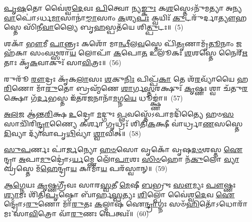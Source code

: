 {\anuvakamend[{}]}

\-\ul{𑌪𑍃}\-\-\ul{𑌷}\-𑌤𑍋 𑌵𑍈॑𑌶𑍍𑌵\-\ul{𑌦𑍇}\-𑌵𑌃 \ul{𑌪𑌿}\-𑌤𑍍𑌵𑍋 𑌨𑍍𑌯\-\ul{𑌙𑍍𑌕𑍁𑌃} 𑌕\-\ul{𑌶}\-𑌸𑍍𑌤𑍇\-𑌽𑌨𑍁᳴𑌮𑌤𑍍𑌯𑌾 𑌅𑌨𑍍𑌯\-\ul{𑌵𑌾}\-𑌪𑍋॑\-𑌽𑌰𑍍𑌧\-\ul{𑌮𑌾}\-𑌸𑌾𑌨𑌾॑\-\ul{𑌮𑍍𑌮𑌾}\-𑌸𑌾𑌂 \ul{𑌕}\-𑌶𑍍𑌯\-\ul{𑌪𑌃} 𑌕𑍍𑌵𑌯𑌿𑌃᳴ \ul{𑌕𑍁}\-𑌟𑌰𑍁᳴𑌰𑍍𑌦𑌾\-\ul{𑌤𑍍𑌯𑍗}\-𑌹𑌸𑍍𑌤𑍇 𑌸𑌿᳴𑌨𑍀\-\ul{𑌵𑌾}\-𑌲𑍍𑌯𑍈 𑌬𑍃\-\ul{𑌹}\-𑌸𑍍𑌪𑌤᳴𑌯𑍇 𑌶𑌿\-\ul{𑌤𑍍𑌪𑍁}\-𑌟𑌃॥~(5)

{\anuvakamend[{}]}

𑌶𑌕𑌾᳴ \ul{𑌭𑍗}\-𑌮𑍀 \ul{𑌪𑌾}\-𑌨𑍍𑌤𑍍𑌰𑌃 𑌕𑌶𑍋᳴ 𑌮𑌾\-\ul{𑌨𑍍𑌥𑍀}\-𑌲\-\ul{𑌵}\-𑌸𑍍𑌤𑍇 𑌪𑌿᳴\-\ul{𑌤𑍃}\-𑌣𑌾𑌮𑍃᳴\-\ul{𑌤𑍂}\-𑌨𑌾𑌂 𑌜𑌹᳴𑌕𑌾 𑌸𑌂𑌵\-\ul{𑌥𑍍𑌸}\-𑌰𑌾\-\ul{𑌯} 𑌲𑍋𑌪𑌾᳴ \ul{𑌕}\-𑌪𑍋\-\ul{𑌤} 𑌉𑌲𑍂᳴𑌕𑌃 \ul{𑌶}\-𑌶𑌸𑍍𑌤𑍇 𑌨𑍈𑌰𑍍\mbox{}᳴\-\ul{𑌋}\-𑌤𑌾𑌃 𑌕𑍃᳴\-\ul{𑌕}\-𑌵𑌾𑌕𑍁𑌃᳴ 𑌸𑌾\-\ul{𑌵𑌿}\-𑌤𑍍𑌰𑌃॥~(56)

{\anuvakamend[{𑌬𑌲𑌾᳴𑌯 𑌪𑍁𑌰𑍁𑌷\-\ul{𑌮𑍃}\-𑌗𑌃 \ul{𑌸𑍗}\-𑌰𑍀 𑌪𑍃᳴\-\ul{𑌷}\-𑌤𑌃 𑌶\-\ul{𑌕𑌾}\-𑌷𑍍𑌟𑌾𑌦᳴\-\ul{𑌶𑌾}\-𑌷𑍍𑌟𑌾𑌦᳴𑌶}]}%

𑌰𑍁𑌰𑍂᳴ \ul{𑌰𑍗}\-𑌦𑍍𑌰𑌃 𑌕𑍃᳴𑌕\-\ul{𑌲𑌾}\-𑌸𑌃 \ul{𑌶}\-𑌕𑍁\-\ul{𑌨𑌿𑌃} 𑌪𑌿𑌪𑍍𑌪᳴\-\ul{𑌕𑌾} 𑌤𑍇 𑌶᳴\-\ul{𑌰}\-𑌵𑍍𑌯𑌾᳴𑌯𑍈 𑌹\-\ul{𑌰𑌿}\-𑌣𑍋 𑌮𑌾᳴\-\ul{𑌰𑍁}\-𑌤𑍋 𑌬𑍍𑌰𑌹𑍍𑌮᳴𑌣𑍇 \ul{𑌶𑌾}\-𑌰𑍍𑌗\-\ul{𑌸𑍍𑌤}\-𑌰𑌕𑍍𑌷𑍁𑌃᳴ \ul{𑌕𑍃}\-𑌷𑍍𑌣𑌃 𑌶𑍍𑌵𑌾 𑌚᳴𑌤𑍁\-\ul{𑌰}\-𑌕𑍍𑌷𑍋 𑌗᳴\-\ul{𑌰𑍍𑌦}\-𑌭𑌸𑍍𑌤 𑌇᳴𑌤𑌰\-\ul{𑌜}\-𑌨𑌾𑌨𑌾᳴\-\ul{𑌮}\-𑌗𑍍𑌨\-\ul{𑌯𑍇} 𑌧𑍂𑌙𑍍𑌕𑍍𑌷𑍍𑌣𑌾॑॥~(57)

{\anuvakamend[{𑌰𑍁𑌰𑍁᳴𑌰𑍍𑌵𑌿𑍞\-\ul{𑌶}\-𑌤𑌿𑌃}]}%

\-\ul{𑌅}\-\-\ul{𑌲}\-𑌜 𑌆॑𑌨𑍍𑌤\-\ul{𑌰𑌿}\-𑌕𑍍𑌷 \ul{𑌉}\-𑌦𑍍𑌰𑍋 \ul{𑌮}\-𑌦𑍍𑌗𑍁𑌃 \ul{𑌪𑍍𑌲}\-𑌵𑌸𑍍𑌤𑍇᳴\-𑌽𑌪𑌾𑌮𑌦𑌿᳴𑌤𑍍𑌯𑍈 𑌹𑍞\-\ul{𑌸}\-𑌸𑌾𑌚𑌿᳴𑌰𑌿\-\ul{𑌨𑍍𑌦𑍍𑌰𑌾}\-𑌣𑍍𑌯𑍈 𑌕𑍀𑌰𑍍\mbox{}\-\ul{𑌶𑌾} 𑌗𑍃𑌧𑍍𑌰𑌃᳴ 𑌶𑌿𑌤𑌿\-\ul{𑌕}\-𑌕𑍍𑌷𑍀 𑌵𑌾॑𑌰𑍍𑌧𑍍𑌰𑌾\-\ul{𑌣}\-𑌸𑌸𑍍𑌤𑍇 \ul{𑌦𑌿}\-𑌵𑍍𑌯𑌾 𑌦𑍍𑌯𑌾᳴𑌵𑌾𑌪𑍃\-\ul{𑌥𑌿}\-𑌵𑍍𑌯𑌾॑ \ul{𑌶𑍍𑌵𑌾}\-𑌵𑌿𑌤𑍍॥~(58)

{\anuvakamend[{}]}

\-\ul{𑌸𑍁}\-\-\ul{𑌪}\-𑌰𑍍𑌣𑌃 𑌪𑌾॑\-\ul{𑌰𑍍𑌜}\-𑌨𑍍𑌯𑍋 \ul{𑌹}\-\-\ul{𑍞}\-𑌸𑍋 𑌵𑍃𑌕𑍋᳴ 𑌵𑍃𑌷\-\ul{𑌦}\-\-\ul{𑍞}\-𑌶𑌸𑍍𑌤 \ul{𑌐}\-𑌨𑍍𑌦𑍍𑌰𑌾 \ul{𑌅}\-𑌪𑌾\-\ul{𑌮𑍁}\-𑌦𑍍𑌰𑍋॑\-𑌽\-\ul{𑌰𑍍𑌯}\-𑌮𑍍𑌣𑍇 𑌲𑍋᳴\-\ul{𑌪𑌾}\-𑌶𑌃 \ul{𑌸𑌿}\-\-\ul{𑍞}\-𑌹𑍋 𑌨᳴\-\ul{𑌕𑍁}\-𑌲𑍋 \ul{𑌵𑍍𑌯𑌾}\-𑌘𑍍𑌰𑌸𑍍𑌤𑍇 𑌮᳴\-\ul{𑌹𑍇}\-𑌨𑍍𑌦𑍍𑌰𑌾\-\ul{𑌯} 𑌕𑌾𑌮𑌾᳴\-\ul{𑌯} 𑌪𑌰᳴𑌸𑍍𑌵𑌾𑌨𑍍॥~(59)

{\anuvakamend[{\-\ul{𑌅}\-\-\ul{𑌲}\-𑌜𑌃 𑌸𑍁᳴\-\ul{𑌪}\-𑌰𑍍𑌣𑍋॑\-𑌽𑌷𑍍𑌟𑌾𑌦᳴𑌶𑌾\-\ul{𑌷𑍍𑌟𑌾}\-𑌦᳴𑌶}]}%

\-\ul{𑌆}\-\-\ul{𑌗𑍍𑌨𑍇}\-𑌯𑌃 \ul{𑌕𑍃}\-𑌷𑍍𑌣𑌗𑍍𑌰𑍀᳴𑌵𑌃 𑌸𑌾𑌰\-\ul{𑌸𑍍𑌵}\-𑌤𑍀 \ul{𑌮𑍇}\-𑌷𑍀 \ul{𑌬}\-𑌭𑍍𑌰𑍁𑌃 \ul{𑌸𑍗}\-𑌮𑍍𑌯𑌃 \ul{𑌪𑍗}\-𑌷𑍍𑌣𑌃 \ul{𑌶𑍍𑌯𑌾}\-𑌮𑌃 𑌶𑌿᳴𑌤𑌿\-\ul{𑌪𑍃}\-𑌷𑍍𑌠𑍋 𑌬𑌾᳴𑌰𑍍\mbox{}𑌹\-\ul{𑌸𑍍𑌪}\-𑌤𑍍𑌯𑌃 \ul{𑌶𑌿}\-𑌲𑍍𑌪𑍋 𑌵𑍈॑𑌶𑍍𑌵\-\ul{𑌦𑍇}\-𑌵 \ul{𑌐}\-𑌨𑍍𑌦𑍍𑌰𑍋᳴\-𑌽\-\ul{𑌰𑍁}\-𑌣𑍋 𑌮𑌾᳴\-\ul{𑌰𑍁}\-𑌤𑌃 \ul{𑌕}\-𑌲𑍍𑌮𑌾𑌷᳴ 𑌐\-\ul{𑌨𑍍𑌦𑍍𑌰𑌾}\-𑌗𑍍𑌨𑌃 𑌸𑍞᳴\-\ul{𑌹𑌿}\-𑌤𑍋᳴\-𑌽𑌧𑍋𑌰𑌾᳴𑌮𑌃 𑌸𑌾\-\ul{𑌵𑌿}\-𑌤𑍍𑌰𑍋 𑌵𑌾᳴\-\ul{𑌰𑍁}\-𑌣𑌃 𑌪𑍇𑌤𑍍𑌵𑌃᳴॥~(60)


